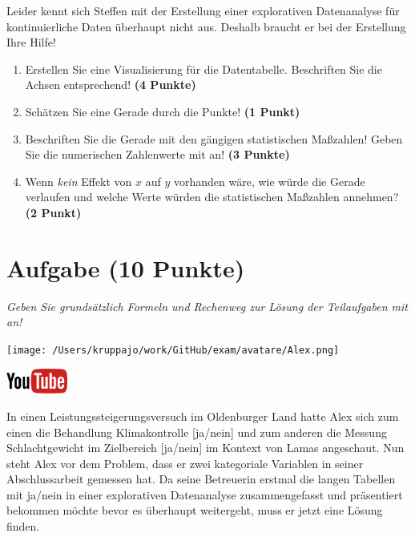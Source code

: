 \documentclass[a4paper, 9pt]{scrartcl}\usepackage[]{graphicx}\usepackage[]{xcolor}
\begin{document}
Leider kennt sich Steffen mit der Erstellung einer explorativen Datenanalyse für kontinuierliche Daten überhaupt nicht aus. Deshalb braucht er bei der Erstellung Ihre Hilfe!

\begin{enumerate}
\item Erstellen Sie eine Visualisierung für die Datentabelle. Beschriften Sie
  die Achsen entsprechend! \textbf{(4 Punkte)}
\item Schätzen Sie eine Gerade durch die Punkte! \textbf{(1 Punkt)}
\item Beschriften Sie die Gerade mit den gängigen statistischen Maßzahlen! Geben Sie die numerischen Zahlenwerte mit an! \textbf{(3 Punkte)}
\item Wenn \textit{kein} Effekt von $x$ auf $y$ vorhanden wäre, wie würde die Gerade verlaufen und welche Werte würden die statistischen Maßzahlen annehmen? \textbf{(2 Punkt)}
\end{enumerate} 
\clearpage

\section{Aufgabe \hfill (10 Punkte)}

\textit{Geben Sie grundsätzlich Formeln und Rechenweg zur Lösung der Teilaufgaben mit an!} \\[1Ex]
 

 
\begin{minipage}[t]{0.5\textwidth}
\texttt{[image: /Users/kruppajo/work/GitHub/exam/avatare/Alex.png]}
\end{minipage}
\begin{minipage}[t]{0.5\textwidth}
\hfill
\href{https://youtu.be/t_1KL77mfmg}{\includegraphics[width = 2cm]{img/youtube}}\\[1Ex]
\end{minipage}
\vspace{1ex}



In einen Leistungssteigerungsversuch im Oldenburger Land hatte Alex sich zum einen die Behandlung Klimakontrolle [ja/nein] und zum anderen die Messung Schlachtgewicht im Zielbereich [ja/nein] im Kontext von Lamas angeschaut. Nun steht Alex vor dem Problem, dass er zwei kategoriale Variablen in seiner Abschlussarbeit gemessen hat. Da seine Betreuerin erstmal die langen Tabellen mit ja/nein in einer explorativen Datenanalyse zusammengefasst und präsentiert bekommen möchte bevor es überhaupt weitergeht, muss er jetzt eine Lösung finden.
\end{document}
